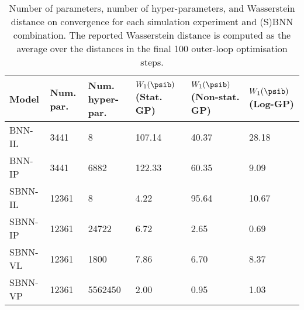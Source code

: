 \begin{table}[!t]
\centering
\caption{Number of parameters, number of hyper-parameters, and Wasserstein distance on convergence for each simulation experiment and (S)BNN combination. The reported Wasserstein distance is computed as the average over the distances in the final 100 outer-loop optimisation steps. \label{tab:results}} 
\begin{tabular}{lp{1.5cm}p{1.75cm}p{1.85cm}p{2.6cm}p{1.75cm}}
  \hline
Model & Num. par. & Num. hyper-par. & $W_1(\psib)$ (Stat. GP) & $W_1(\psib)$ \newline (Non-stat. GP) & $W_1(\psib)$ (Log-GP) \\ 
  \hline
BNN-IL & 3441 & 8 & 107.14 & 40.37 & 28.18 \\ 
  BNN-IP & 3441 & 6882 & 122.33 & 60.35 & 9.09 \\ 
  SBNN-IL & 12361 & 8 & 4.22 & 95.64 & 10.67 \\ 
  SBNN-IP & 12361 & 24722 & 6.72 & 2.65 & 0.69 \\ 
  SBNN-VL & 12361 & 1800 & 7.86 & 6.70 & 8.37 \\ 
  SBNN-VP & 12361 & 5562450 & 2.00 & 0.95 & 1.03 \\ 
   \hline
\end{tabular}
\end{table}


